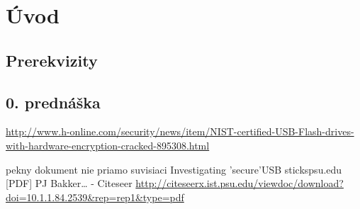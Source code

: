 \chapter{Úvod}\label{chapter:uvod}

\section{Prerekvizity}

\section{0. prednáška}

\url{http://www.h-online.com/security/news/item/NIST-certified-USB-Flash-drives-with-hardware-encryption-cracked-895308.html}

pekny dokument nie priamo suvisiaci
Investigating 'secure'USB stickspsu.edu [PDF]
PJ Bakker… - Citeseer
\url{http://citeseerx.ist.psu.edu/viewdoc/download?doi=10.1.1.84.2539&rep=rep1&type=pdf}
